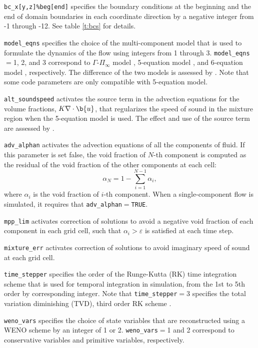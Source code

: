 \documentclass[11pt]{article}
\begin{document}
\texttt{bc\_x[y,z]\%beg[end]} specifies the boundary conditions at the beginning and the end of domain boundaries in each coordinate direction by a negative integer from -1 through -12. See table \ref{t:bcs} for details.

\texttt{model\_eqns} specifies the choice of the multi-component model that is used to formulate the dynamics of the flow using integers from 1 through 3. 
\texttt{model\_eqns}$=$1, 2, and 3 correspond to $\Gamma$-$\Pi_\infty$ model \citep{Johnsen08}, 5-equation model \citep{Allaire02}, and 6-equation model \citep{Saurel09}, respectively.
The difference of the two models is assessed by \citep{Schmidmayer19}.
Note that some code parameters are only compatible with 5-equation model.

\texttt{alt\_soundspeed} activates the source term in the advection equations for the volume fractions, $K\nabla\cdot\b{u}$, that regularizes the speed of sound in the mixture region when the 5-equation model is used. The effect and use of the source term are assessed by \citet{Schmidmayer19}.

\texttt{adv\_alphan} activates the advection equations of all the components of fluid. If this parameter is set false, the void fraction of $N$-th component is computed as the residual of the void fraction of the other components at each cell:
\begin{equation}
    \alpha_N=1-\sum^{N-1}_{i=1} \alpha_i,
\end{equation}
where $\alpha_i$ is the void fraction of $i$-th component. When a single-component flow is simulated, it requires that \texttt{adv\_alphan}$=$\texttt{TRUE}.

\texttt{mpp\_lim} activates correction of solutions to avoid a negative void fraction of each component in each grid cell, such that $\alpha_i>\varepsilon$ is satisfied at each time step.

\texttt{mixture\_err} activates correction of solutions to avoid imaginary speed of sound at each grid cell.

\texttt{time\_stepper} specifies the order of the Runge-Kutta (RK) time integration scheme that is used for temporal integration in simulation, from the 1st to 5th order by corresponding integer. 
Note that \texttt{time\_stepper}$=$3 specifies the total variation diminishing (TVD), third order RK scheme \citep{Gottlieb98}.

\texttt{weno\_vars} specifies the choice of state variables that are reconstructed using a WENO scheme by an integer of 1 or 2. 
\texttt{weno\_vars}$=$1 and 2 correspond to conservative variables and primitive variables, respectively.
\end{document}
